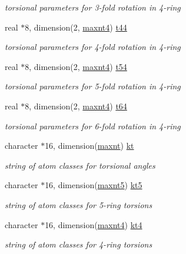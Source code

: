 \begin{DoxyCompactItemize}
\begin{DoxyCompactList}\small\item\em torsional parameters for 3-\/fold rotation in 4-\/ring \end{DoxyCompactList}\item 
real $\ast$8, dimension(2, \hyperlink{classktorsn_a5a45df497069015a810999bb1fab9abe}{maxnt4}) \hyperlink{classktorsn_a3174f86ed4ac5953f453f5084ebf8510}{t44}
\begin{DoxyCompactList}\small\item\em torsional parameters for 4-\/fold rotation in 4-\/ring \end{DoxyCompactList}\item 
real $\ast$8, dimension(2, \hyperlink{classktorsn_a5a45df497069015a810999bb1fab9abe}{maxnt4}) \hyperlink{classktorsn_a9af7f060836dfcf31560112cc0bb9ee6}{t54}
\begin{DoxyCompactList}\small\item\em torsional parameters for 5-\/fold rotation in 4-\/ring \end{DoxyCompactList}\item 
real $\ast$8, dimension(2, \hyperlink{classktorsn_a5a45df497069015a810999bb1fab9abe}{maxnt4}) \hyperlink{classktorsn_ae19a13b15f2efafe900c71cff043544f}{t64}
\begin{DoxyCompactList}\small\item\em torsional parameters for 6-\/fold rotation in 4-\/ring \end{DoxyCompactList}\item 
character $\ast$16, dimension(\hyperlink{classktorsn_a24826636e5e70f0f36f28baf53af9ceb}{maxnt}) \hyperlink{classktorsn_a820875b0da7d7e0bbe8a8ac513009784}{kt}
\begin{DoxyCompactList}\small\item\em string of atom classes for torsional angles \end{DoxyCompactList}\item 
character $\ast$16, dimension(\hyperlink{classktorsn_a0391ba344c3a8a876ef6d3853b8e1a10}{maxnt5}) \hyperlink{classktorsn_a91ee3474936fcbf35dea760f305ec374}{kt5}
\begin{DoxyCompactList}\small\item\em string of atom classes for 5-\/ring torsions \end{DoxyCompactList}\item 
character $\ast$16, dimension(\hyperlink{classktorsn_a5a45df497069015a810999bb1fab9abe}{maxnt4}) \hyperlink{classktorsn_a0930cb53cbd4f62e40a7af7518449ef8}{kt4}
\begin{DoxyCompactList}\small\item\em string of atom classes for 4-\/ring torsions \end{DoxyCompactList}\end{DoxyCompactItemize}


